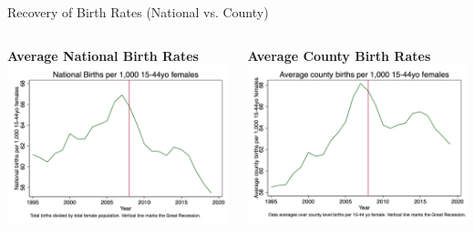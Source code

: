 \documentclass{beamer}
\begin{document}
\begin{frame}{Recovery of Birth Rates (National vs. County)}
    \centering
    \begin{columns}
        \centering
        \textbf{Average National Birth Rates}
        \includegraphics[width=\linewidth,height=0.6\textheight,keepaspectratio]{./lecture_includes/national_br.png}
        
        \centering
        \textbf{Average County Birth Rates}
        \includegraphics[width=\linewidth,height=0.6\textheight,keepaspectratio]{./lecture_includes/county_br.png}
    \end{columns}
\end{frame}
\end{document}
